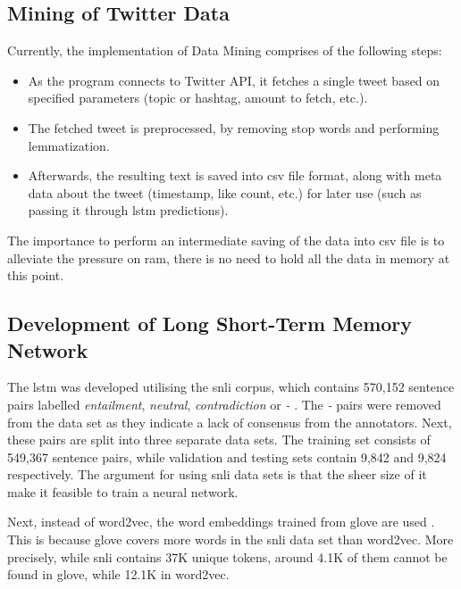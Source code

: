    \subsection{Mining of Twitter Data} \label{twitterdata}
        Currently, the implementation of Data Mining comprises of the following steps:
        \begin{itemize}
            \item As the program connects to Twitter API, it fetches a single tweet based on specified parameters (topic or hashtag, amount to fetch, etc.).
            
            \item The fetched tweet is preprocessed, by removing stop words and performing lemmatization.
            
            \item Afterwards, the resulting text is saved into \gls{csv} file format, along with meta data about the tweet (timestamp, like count, etc.) for later use (such as passing it through \gls{lstm} predictions).
        \end{itemize}
        
        The importance to perform an intermediate saving of the data into \gls{csv} file is to alleviate the pressure on \gls{ram}, there is no need to hold all the data in memory at this point.
        
    \subsection{Development of Long Short-Term Memory Network} \label{devlstm}
        The \gls{lstm} was developed utilising the \gls{snli} corpus, which contains 570,152 sentence pairs labelled \textit{entailment}, \textit{neutral}, \textit{contradiction} or \textit{-} \autocite{Bowman2015ALA}. The \textit{-} pairs were removed from the data set as they indicate a lack of consensus from the annotators. Next, these pairs are split into three separate data sets. The training set consists of 549,367 sentence pairs, while validation and testing sets contain 9,842 and 9,824 respectively. The argument for using \gls{snli} data sets is that the sheer size of it make it feasible to train a neural network.
        
        Next, instead of word2vec, the word embeddings trained from \gls{glove} are used \autocite{Pennington2014GloveGV}. This is because \gls{glove} covers more words in the \gls{snli} data set than word2vec. More precisely, while \gls{snli} contains 37K unique tokens, around 4.1K of them cannot be found in \gls{glove}, while 12.1K in word2vec.
        
